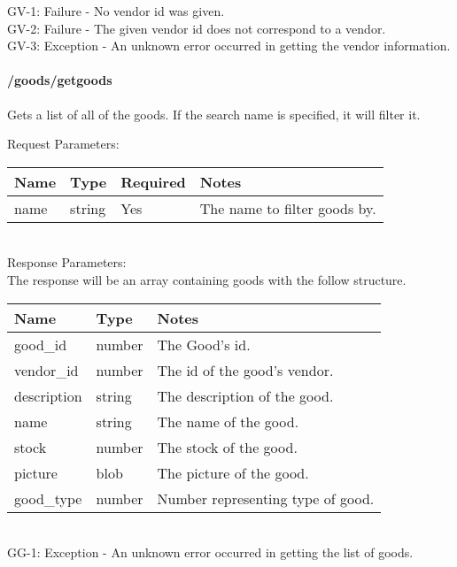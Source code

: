 \documentclass{article}[11pt]
\begin{document}
\ErrorsSession
GV-1: Failure - No vendor id was given. \\
GV-2: Failure - The given vendor id does not correspond to a vendor. \\
GV-3: Exception - An unknown error occurred in getting the vendor information. \\

\paragraph{/goods/getgoods}\textbf{}

Gets a list of all of the goods. If the search name is specified, it will filter it.

\noindent
Request Parameters:

\noindent
\begin{tabular}{|l|l|l|l|}
\hline
\textbf{Name} & \textbf{Type} & \textbf{Required} & \textbf{Notes} \\
\hline
name & string & Yes & The name to filter goods by. \\
\hline
\end{tabular} \\

\noindent
Response Parameters: \\

\noindent
The response will be an array containing goods with the follow structure.

\noindent
\begin{tabular}{|l|l|l|}
\hline
\textbf{Name} & \textbf{Type} & \textbf{Notes} \\
\hline
good\_id & number & The Good's id. \\
vendor\_id & number & The id of the good's vendor. \\
description & string & The description of the good. \\
name & string & The name of the good. \\
stock & number & The stock of the good. \\
picture & blob & The picture of the good. \\
good\_type & number & Number representing type of good. \\
\hline
\end{tabular} \\

\ErrorsSession
GG-1: Exception - An unknown error occurred in getting the list of goods. \\
\end{document}
